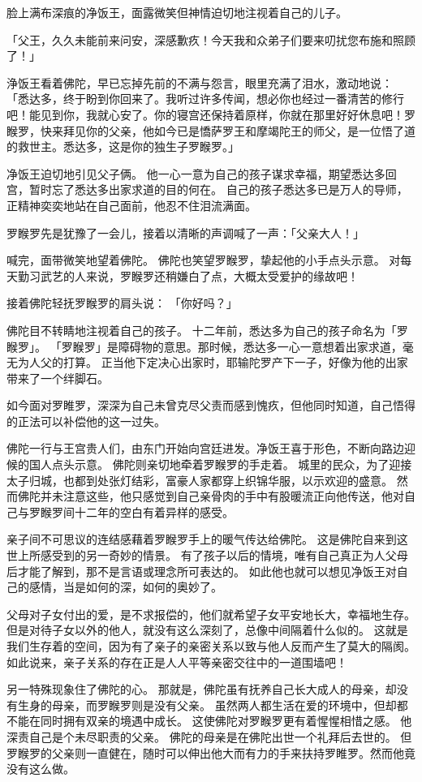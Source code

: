 \documentclass[twoside,openany]{book}
\begin{document}
脸上满布深痕的净饭王，面露微笑但神情迫切地注视着自己的儿子。

「父王，久久未能前来问安，深感歉疚！今天我和众弟子们要来叨扰您布施和照顾了！」

浄饭王看着佛陀，早已忘掉先前的不满与怨言，眼里充满了泪水，激动地说：
「悉达多，终于盼到你回来了。我听过许多传闻，想必你也经过一番清苦的修行吧！能见到你，我就心安了。你的寝宫还保持着原样，你就在那里好好休息吧！罗睺罗，快来拜见你的父亲，他如今已是憍萨罗王和摩竭陀王的师父，是一位悟了道的救世主。悉达多，这是你的独生子罗睺罗。」

净饭王迫切地引见父子俩。
他一心一意为自己的孩子谋求幸福，期望悉达多回宫，暂时忘了悉达多出家求道的目的何在。
自己的孩子悉达多已是万人的导师，正精神奕奕地站在自己面前，他忍不住泪流满面。

罗睺罗先是犹豫了一会儿，接着以清晰的声调喊了一声：「父亲大人！」

喊完，面带微笑地望着佛陀。
佛陀也笑望罗睺罗，挚起他的小手点头示意。
对每天勤习武艺的人来说，罗睺罗还稍嫌白了点，大概太受爱护的缘故吧！

接着佛陀轻抚罗睺罗的肩头说：
「你好吗？」

佛陀目不转睛地注视着自己的孩子。
十二年前，悉达多为自己的孩子命名为「罗睺罗」。
「罗睺罗」是障碍物的意思。那时候，悉达多一心一意想着出家求道，毫无为人父的打算。
正当他下定决心出家时，耶输陀罗产下一子，好像为他的出家带来了一个绊脚石。

如今面对罗睢罗，深深为自己未曾克尽父责而感到愧疚，但他同时知道，自己悟得的正法可以补偿他的这一过失。

佛陀一行与王宫贵人们，由东门开始向宫廷进发。净饭王喜于形色，不断向路边迎候的国人点头示意。
佛陀则亲切地牵着罗睺罗的手走着。
城里的民众，为了迎接太子归城，也都到处张灯结彩，富豪人家都穿上织锦华服，以示欢迎的盛意。
然而佛陀并未注意这些，他只感觉到自己亲骨肉的手中有股暖流正向他传送，他对自己与罗睺罗间十二年的空白有着异样的感受。

亲子间不可思议的连结感藉着罗睺罗手上的暖气传达给佛陀。
这是佛陀自来到这世上所感受到的另一奇妙的情景。
有了孩子以后的情境，唯有自己真正为人父母后才能了解到，那不是言语或理念所可表达的。
如此他也就可以想见净饭王对自己的感情，当是如何的深，如何的奥妙了。

父母对子女付出的爱，是不求报偿的，他们就希望子女平安地长大，幸福地生存。
但是对待子女以外的他人，就没有这么深刻了，总像中间隔着什么似的。
这就是我们生存着的空间，因为有了亲子的亲密关系以致与他人反而产生了莫大的隔阂。
如此说来，亲子关系的存在正是人人平等亲密交往中的一道围墙吧！

另一特殊现象住了佛陀的心。
那就是，佛陀虽有抚养自己长大成人的母亲，却没有生身的母亲，而罗睺罗则是没有父亲。
虽然两人都生活在爱的环境中，但却都不能在同时拥有双亲的境遇中成长。
这使佛陀对罗睺罗更有着惺惺相惜之感。
他深责自己是个未尽职责的父亲。
佛陀的母亲是在佛陀出世一个礼拜后去世的。
但罗睺罗的父亲则一直健在，随时可以伸出他大而有力的手来扶持罗睢罗。然而他竟没有这么做。
\end{document}
